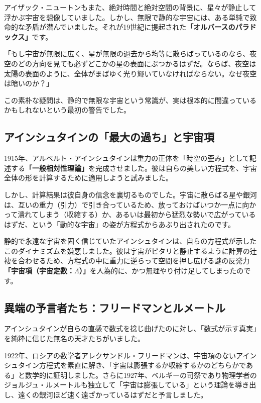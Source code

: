 アイザック・ニュートンもまた、絶対時間と絶対空間の背景に、星々が静止して浮かぶ宇宙を想像していました。しかし、無限で静的な宇宙には、ある単純で致命的な矛盾が潜んでいました。それが19世紀に提起された\textbf{「オルバースのパラドックス」}です。

「もし宇宙が無限に広く、星が無限の過去から均等に散らばっているのなら、夜空のどの方向を見ても必ずどこかの星の表面にぶつかるはずだ。ならば、夜空は太陽の表面のように、全体がまばゆく光り輝いていなければならない。なぜ夜空は暗いのか？」

この素朴な疑問は、静的で無限な宇宙という常識が、実は根本的に間違っているかもしれないという最初の警告でした。

\subsection{アインシュタインの「最大の過ち」と宇宙項}

1915年、アルベルト・アインシュタインは重力の正体を「時空の歪み」として記述する\textbf{「一般相対性理論」}を完成させました。彼は自らの美しい方程式を、宇宙全体の形を計算するために適用しようと試みました。

しかし、計算結果は彼自身の信念を裏切るものでした。宇宙に散らばる星や銀河は、互いの重力（引力）で引き合っているため、放っておけばいつか一点に向かって潰れてしまう（収縮する）か、あるいは最初から猛烈な勢いで広がっているはずだ、という「動的な宇宙」の姿が方程式からあぶり出されたのです。

静的で永遠な宇宙を固く信じていたアインシュタインは、自らの方程式が示したこのダイナミズムを嫌悪しました。彼は宇宙がピタリと静止するように計算の辻褄を合わせるため、方程式の中に重力に逆らって空間を押し広げる謎の反発力\textbf{「宇宙項（宇宙定数：\(\Lambda\)）」}を人為的に、かつ無理やり付け足してしまったのです。

\subsection{異端の予言者たち：フリードマンとルメートル}

アインシュタインが自らの直感で数式を捻じ曲げたのに対し、「数式が示す真実」を純粋に信じた無名の天才たちがいました。

1922年、ロシアの数学者アレクサンドル・フリードマンは、宇宙項のないアインシュタイン方程式を素直に解き、「宇宙は膨張するか収縮するかのどちらかである」と数学的に証明しました。さらに1927年、ベルギーの司祭であり物理学者のジョルジュ・ルメートルも独立して「宇宙は膨張している」という理論を導き出し、遠くの銀河ほど速く遠ざかっているはずだと予言しました。

